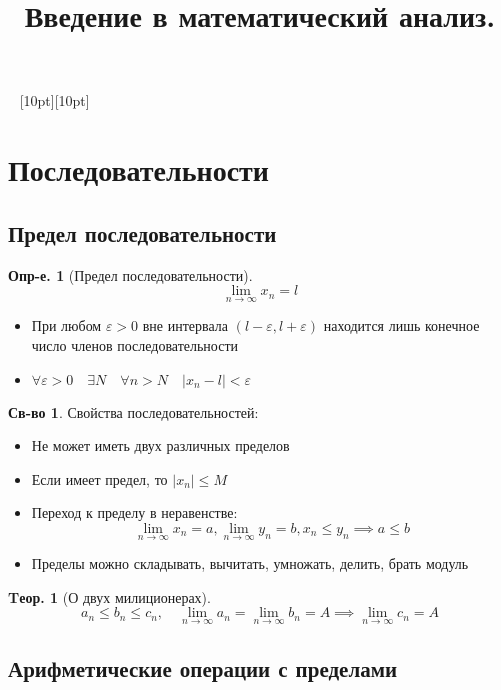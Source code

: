 \documentclass[a4paper,12pt]{article}
\title{Введение в математический анализ.}
\author{}
\date{}
\numberwithin{figure}{section}
\theoremstyle{definition}
\newtheorem{definition}{Опр-е.}[section]
\newtheorem*{property}{Св-во}  %
\theoremstyle{definition}
\newtheorem{theorem}{Tеор.}[section]
\def\eps{\varepsilon}
\def\ntoinf{n \to \infty}
\def\leqs{\leqslant}
\def\vignette {\vspace{48pt} \noindent \hrulefill~ \raisebox{-8pt}[10pt][10pt]{\Huge\ding{102}}~ \hrulefill}
\begin{document}
\maketitle
\tableofcontents


\vignette
\section{Последовательности}

\subsection{Предел последовательности}

\begin{definition}[Предел последовательности]
	\[ \lim_{\ntoinf} x_n = l \]
	\begin{itemize}
		\item При любом $\eps>0$ вне интервала $(l-\eps,l+\eps)$
			  находится лишь конечное число членов последовательности
		\item $\forall \eps>0 \quad \exists N \quad \forall n>N \quad |x_n - l|<\eps$
	\end{itemize}
\end{definition}

\begin{property}
	Свойства последовательностей:
	\begin{itemize}
	\item Не может иметь двух различных пределов
	\item Если имеет предел, то $|x_n| \leqs M$
	\item Переход к пределу в неравенстве: \[
		\lim_{\ntoinf}x_n=a, \lim_{\ntoinf}y_n=b, x_n \leqs y_n
		\implies a \leqs b
		\]
	\item Пределы можно складывать, вычитать, умножать, делить, брать модуль
	\end{itemize}
\end{property}

\begin{theorem}[О двух милиционерах]
	\[ a_n \leqs b_n \leqs c_n , \quad
	   \lim_{\ntoinf}a_n = \lim_{\ntoinf}b_n = A
	   \implies \lim_{\ntoinf}c_n = A \]
\end{theorem}


\subsection{Арифметические операции с пределами}
\end{document}
